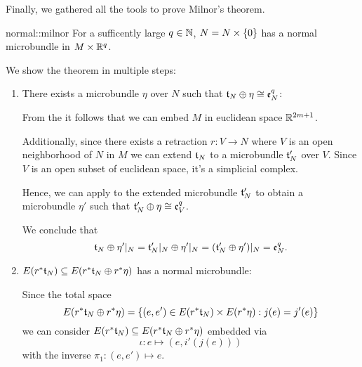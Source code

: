 \begin{scope}
    \newcommand{\rwhitney} {
        \whitney{\ind{r}\bt_N}{\ind{r}\eta}
    }
    \newcommand{\rtn} {
        \ind{r}\bt_N
    }

    \begin{myparagraph}
        Finally, we gathered all the tools to prove Milnor's theorem.
    \end{myparagraph}

    \begin{mytheorem}{normal::milnor}{}
        For a sufficently large $q \in \N$, $N = \cyldown{N}$ has a normal microbundle in $M \times \R^q$.
    \end{mytheorem}

    \begin{myproof}
        We show the theorem in multiple steps:
        \begin{enumerate}
            \item There exists a microbundle $\eta$ over $N$ such that $\whitney{\bt_N}{\eta} \cong \be[q]{N}$:
            
            From the  it follows that
            we can embed $M$ in euclidean space $\R^{2m + 1}$.

            Additionally, since there exists a retraction $r: V \to N$
            where $V$ is an open neighborhood of $N$ in $M$ we can extend $\bt_N$
            to a microbundle $\bt_N'$ over $V$.
            Since $V$ is an open subset of euclidean space, it's a simplicial complex.

            Hence, we can apply  to the extended microbundle $\bt_N'$
            to obtain a microbundle $\eta'$ such that $\whitney{\bt_N'}{\eta} \cong \be[q]{V}$.

            We conclude that
            \[
                \whitney{\bt_N}{\eta'\restr{N}}
                = \whitney{\bt_N'\restr{N}}{\eta'\restr{N}}
                = (\whitney{\bt_N'}{\eta'})\restr{N} = \be[q]{N}.
            \]

            \item $E(\rtn) \sub E(\rwhitney)$ has a normal microbundle:

            Since the total space
            \[ E(\rwhitney) = \set{(e, e') \in E(\rtn) \times E(\ind{r}\eta)}{j(e) = j'(e)} \]
            we can consider $E(\rtn) \sub E(\rwhitney)$ embedded via
            \[ \iota: e \mapsto (e, i'(j(e))) \]
            with the inverse $\pi_1: (e, e') \mapsto e$.


\end{enumerate}
\end{myproof}
\end{scope}
